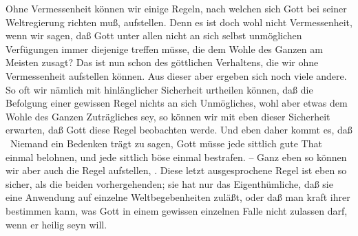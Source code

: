 \begin{aufza}
\item[\RWbet{Antwort.}] Ohne Vermessenheit können wir einige Regeln, nach welchen sich Gott bei seiner Weltregierung richten muß, aufstellen. Denn es ist doch wohl nicht Vermessenheit, wenn wir sagen, daß Gott unter allen nicht an sich selbst unmöglichen Verfügungen immer diejenige treffen müsse, die dem Wohle des Ganzen am Meisten zusagt? Das ist nun schon  des göttlichen Verhaltens, die wir ohne Vermessenheit aufstellen können. Aus dieser aber ergeben sich noch viele andere. So oft wir nämlich mit hinlänglicher Sicherheit urtheilen können, daß die Befolgung einer gewissen Regel nichts an sich Unmögliches, wohl aber etwas dem Wohle des Ganzen Zuträgliches sey, so können wir mit eben dieser Sicherheit erwarten, daß Gott diese Regel beobachten werde. Und eben daher kommt es, daß \zB\ Niemand ein Bedenken trägt zu sagen, Gott müsse jede sittlich gute That einmal belohnen, und jede sittlich böse einmal bestrafen. -- Ganz eben so können wir aber auch die Regel aufstellen, . Diese letzt ausgesprochene Regel ist eben so sicher, als die beiden vorhergehenden; sie hat nur das Eigenthümliche, daß sie eine Anwendung auf einzelne Weltbegebenheiten zuläßt, oder daß man kraft ihrer bestimmen kann, was Gott in einem gewissen einzelnen Falle nicht zulassen darf, wenn er heilig seyn will.
\end{aufza}


